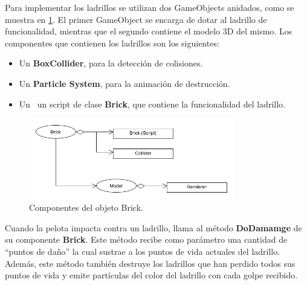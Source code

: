 Para implementar los ladrillos se utilizan dos GameObjects anidados, como se muestra en \ref{diagrama_brick}. El primer GameObject se encarga de dotar al ladrillo de funcionalidad, mientras que el segundo contiene el modelo 3D del mismo. Los componentes que contienen los ladrillos son los siguientes: 
\begin{itemize}
\item Un \textbf{BoxCollider}, para la detección de colisiones.
\item Un \textbf{Particle System}, para la animación de destrucción.
\item Un \ un script de clase \textbf{Brick}, que contiene la funcionalidad del ladrillo.
\end{itemize}
\begin{figure}[h]
	\includegraphics[width=0.8\textwidth]{images/estructura/fisica/bricks}
	\centering
	\caption{Componentes del objeto Brick.}
	\label{diagrama_brick}
\end{figure}

Cuando la pelota impacta contra un ladrillo, llama al método \textbf{DoDamamge} de su componente \textbf{Brick}. Este método recibe como parámetro una cantidad de ``puntos de daño'' la cual sustrae a los puntos de vida actuales del ladrillo. Además, este método también destruye los ladrillos que han perdido todos sus puntos de vida y emite partículas del color del ladrillo con cada golpe recibido. 

